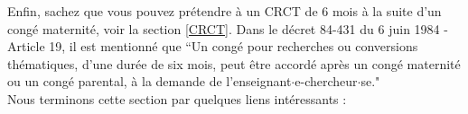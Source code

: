 


Enfin, sachez que vous pouvez pr\'etendre \`a un CRCT de 6 mois \`a la suite d'un cong\'e maternit\'e, voir la section  \ref{CRCT}. Dans le d\'ecret 84-431 du 6 juin 1984 - Article 19, il est mentionn\'e que ``Un cong\'e pour recherches ou conversions th\'ematiques, d'une dur\'ee de six mois, peut \^etre accord\'e apr\`es un cong\'e maternit\'e ou un cong\'e parental, \`a la demande de l'enseignant$\cdot$e-chercheur$\cdot$se."\\

Nous terminons cette section par quelques liens int\'eressants :\\
\\
\\


